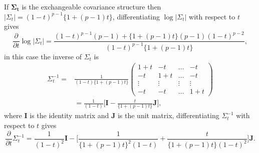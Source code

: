 If $\boldsymbol{\Sigma_{t}}$ is the exchangeable covariance structure then $|\Sigma_{t}| = (1-t)^{p-1} \lbrace 1+(p-1)t \rbrace$, differentiating $\log |\Sigma_{t}|$ with respect to $t$ gives
 \begin{equation}
    \frac{\partial}{\partial t} \log|\Sigma_{t}| = \frac{(1-t)^{p-1} (p-1) + \lbrace 1+(p-1)t \rbrace (p-1)(1-t)^{p-2}}{(1-t)^{p-1} \lbrace 1+(p-1)t \rbrace},
    \label{equ12}
   \end{equation}
in this case the inverse of $\Sigma_{t}$ is
 \begin{equation*}
 \begin{split}
 \Sigma_{t}^{-1}=& \frac{1}{(1-t) \lbrace 1+(p-1)t \rbrace}
  \begin{pmatrix}
    1+t & -t & \hdots & -t  \\
    -t & 1+t & \hdots & -t  \\
    \vdots & \vdots & \vdots & \vdots \\
    -t & -t  & \hdots & 1+t
  \end{pmatrix}\\
&=\frac{1}{(1-t)} \big [\textbf{I} - \frac{t}{ \lbrace 1+(p-1)t \rbrace} \textbf{J} \big ],
  \end{split}
 \end{equation*}
where $\textbf{I}$ is the identity matrix and $\textbf{J}$ is the unit matrix, differentiating $\Sigma_{t}^{-1}$ with respect to $t$ gives 
\begin{equation}
\frac{\partial}{\partial t} \Sigma_{t}^{-1} = \frac{1}{(1-t)^2} \textbf{I} - \Big [ \frac{1}{ \lbrace 1+(p-1)t \rbrace^2 (1-t)} + \frac{t}{\lbrace 1+(p-1)t \rbrace(1-t)^2} \Big ] \textbf{J}.
\label{equ14}
\end{equation}
